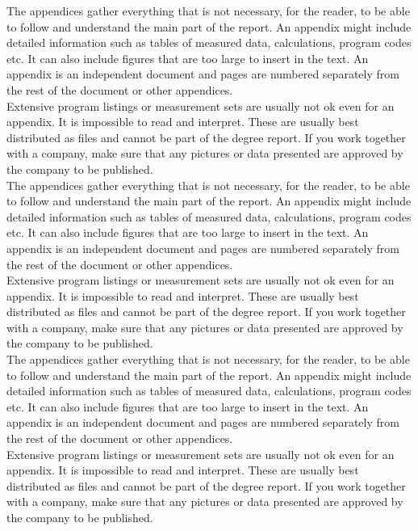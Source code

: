 The appendices gather everything that is not necessary, for the reader, to be able to follow and understand the main part of the report. An appendix might include detailed information such as tables of measured data, calculations, program codes etc. It can also include figures that are too large to insert in the text. An appendix is an independent document and pages are numbered separately from the rest of the document or other appendices.\\
Extensive program listings or measurement sets are usually not ok even for an appendix. It is impossible to read and interpret.  These are usually best distributed as files and cannot be part of the degree report. If you work together with a company, make sure that any pictures or data presented are approved by the company to be published.\\
The appendices gather everything that is not necessary, for the reader, to be able to follow and understand the main part of the report. An appendix might include detailed information such as tables of measured data, calculations, program codes etc. It can also include figures that are too large to insert in the text. An appendix is an independent document and pages are numbered separately from the rest of the document or other appendices.\\
Extensive program listings or measurement sets are usually not ok even for an appendix. It is impossible to read and interpret.  These are usually best distributed as files and cannot be part of the degree report. If you work together with a company, make sure that any pictures or data presented are approved by the company to be published.\\
The appendices gather everything that is not necessary, for the reader, to be able to follow and understand the main part of the report. An appendix might include detailed information such as tables of measured data, calculations, program codes etc. It can also include figures that are too large to insert in the text. An appendix is an independent document and pages are numbered separately from the rest of the document or other appendices.\\
Extensive program listings or measurement sets are usually not ok even for an appendix. It is impossible to read and interpret.  These are usually best distributed as files and cannot be part of the degree report. If you work together with a company, make sure that any pictures or data presented are approved by the company to be published.
